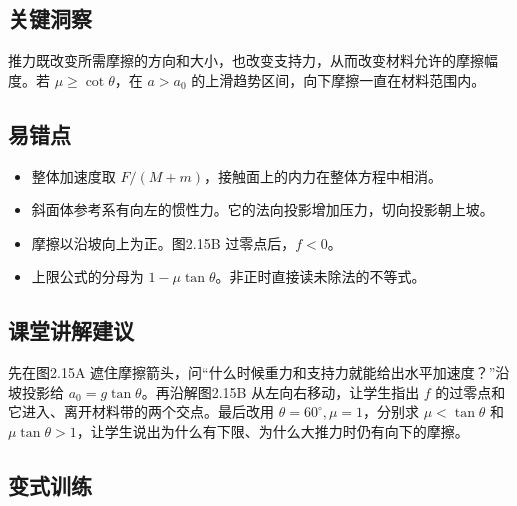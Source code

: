 \documentclass[UTF8,fontset=fandol,a4paper,11pt]{ctexart}
\begin{document}
\subsection*{关键洞察}

推力既改变所需摩擦的方向和大小，也改变支持力，从而改变材料允许的摩擦幅度。若 $\mu\geq\cot\theta$，在 $a>a_0$ 的上滑趋势区间，向下摩擦一直在材料范围内。



\subsection*{易错点}

\begin{itemize}
\item 整体加速度取 $F/(M+m)$，接触面上的内力在整体方程中相消。
\item 斜面体参考系有向左的惯性力。它的法向投影增加压力，切向投影朝上坡。
\item 摩擦以沿坡向上为正。图2.15B 过零点后，$f<0$。
\item 上限公式的分母为 $1-\mu\tan\theta$。非正时直接读未除法的不等式。
\end{itemize}



\subsection*{课堂讲解建议}

先在图2.15A 遮住摩擦箭头，问“什么时候重力和支持力就能给出水平加速度？”沿坡投影给 $a_0=g\tan\theta$。再沿解图2.15B 从左向右移动，让学生指出 $f$ 的过零点和它进入、离开材料带的两个交点。最后改用 $\theta=60^\circ,\mu=1$，分别求 $\mu<\tan\theta$ 和 $\mu\tan\theta>1$，让学生说出为什么有下限、为什么大推力时仍有向下的摩擦。



\subsection*{变式训练}
\end{document}
